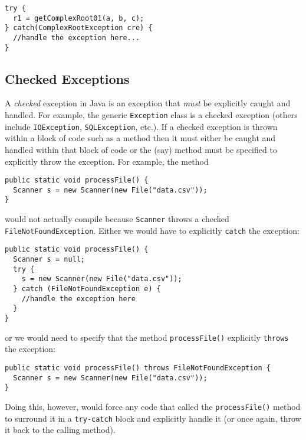 \begin{verbatim}
try {
  r1 = getComplexRoot01(a, b, c);
} catch(ComplexRootException cre) {
  //handle the exception here...
}
\end{verbatim}

\subsection{Checked Exceptions}
\label{section:java:checkedExceptions}

A \emph{checked} exception in Java is an exception that \emph{must}
be explicitly caught and handled.  For example, the generic 
\texttt{Exception} class is a checked exception (others 
include \texttt{IOException}, \texttt{SQLException}, 
etc.).  If a checked exception is thrown within a block of code such 
as a method then it must either be caught and handled within that
block of code or the (say) method must be specified to explicitly 
throw the exception.  For example, the method

\begin{verbatim}
public static void processFile() {
  Scanner s = new Scanner(new File("data.csv"));
}
\end{verbatim}

would not actually compile because \texttt{Scanner}
throws a checked \texttt{FileNotFoundException}.  Either
we would have to explicitly \texttt{catch} the exception:

\begin{verbatim}
public static void processFile() {
  Scanner s = null;
  try {
    s = new Scanner(new File("data.csv"));
  } catch (FileNotFoundException e) {
    //handle the exception here
  }
}
\end{verbatim}

or we would need to specify that the method \texttt{processFile()}
explicitly \texttt{throws} the exception:

\begin{verbatim}
public static void processFile() throws FileNotFoundException {
  Scanner s = new Scanner(new File("data.csv"));
}
\end{verbatim}

Doing this, however, would force any code that called the 
\texttt{processFile()} method to surround it in a 
\texttt{try-catch} block and explicitly handle it (or
once again, throw it back to the calling method).  

